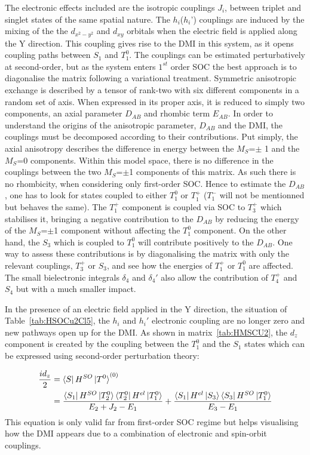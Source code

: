 \documentclass[12pt,a4paper]{report}
\numberwithin{equation}{section}
\begin{document}
The electronic effects included are the isotropic couplings $J_i$, between triplet and singlet states of the same spatial nature. 
The $h_i$($h_i$') couplings are induced by the mixing of the the $d_{x^2-y^2}$ and $d_{xy}$ orbitals when the electric field is applied along the Y direction.
This coupling gives rise to the DMI in this system, as it opens coupling paths between $S_1$ and $T_1^0$.
The couplings can be estimated perturbatively at second-order, but as the system enters $1^{st}$ order SOC the best approach is to diagonalise the matrix following a variational treatment.
Symmetric anisotropic exchange is described by a tensor of rank-two with six different components in a random set of axis.
When expressed in its proper axis, it is reduced to simply two components, an axial parameter $D_{AB}$ and rhombic term $E_{AB}$.
In order to understand the origins of the anisotropic parameter, $D_{AB}$ and the DMI, the couplings must be decomposed according to their contributions.
Put simply, the axial anisotropy describes the difference in energy between the $M_S$=$\pm$ 1 and the $M_S$=0 components.
Within this model space, there is no difference in the couplings between the two $M_S$=$\pm$1 components of this matrix.
As such there is no rhombicity, when considering only first-order SOC.
Hence to estimate the $D_{AB}$, one has to look for states coupled to either $T_1^0$ or $T_1^{+}$ ($T_1^{-}$ will not be mentionned but behaves the same).
The $T_1^{+}$ component is coupled via SOC to $T_3^+$ which stabilises it, bringing a negative contribution to the $D_{AB}$ by reducing the energy of the $M_S$=$\pm$1 component without affecting the $T_1^0$ component.
On the other hand, the $S_3$ which is coupled to $T_1^0$ will contribute positively to the $D_{AB}$. 
One way to assess these contributions is by diagonalising the matrix with only the relevant couplings, $T_3^+$ or $S_3$, and see how the energies of $T_1^+$ or $T_1^0$ are affected.
The small bielectronic integrals $\delta_4$ and $\delta_4'$ also allow the contribution of $T_4^+$ and $S_4$ but with a much smaller impact.

In the presence of an electric field applied in the Y direction, the situation of Table~\ref{tab:HSOCu2Cl5}, the $h_i$ and $h_i'$ electronic coupling are no longer zero and new pathways open up for the DMI.
As shown in matrix~\ref{tab:HMSCU2}, the $d_z$ component is created by the coupling between the $T_1^0$ and the $S_1$ states which can be expressed using second-order perturbation theory:

\begin{align}\label{eq:chemindmi}
    \frac{id_z}{2}&=\bra{S}H^{SO}\ket{T^0}^{(0)}\\
    &=\frac{\bra{S_1}H^{SO}\ket{T_2^0}\bra{T_2^0}H^{el}\ket{T_1^0}}{E_2+J_2-E_1}+\frac{\bra{S_1}H^{el}\ket{S_3}\bra{S_3}H^{SO}\ket{T_1^0}}{E_3-E_1}
\end{align}
This equation is only valid far from first-order SOC regime but helps visualising how the DMI appears due to a combination of electronic and spin-orbit couplings.
\end{document}
